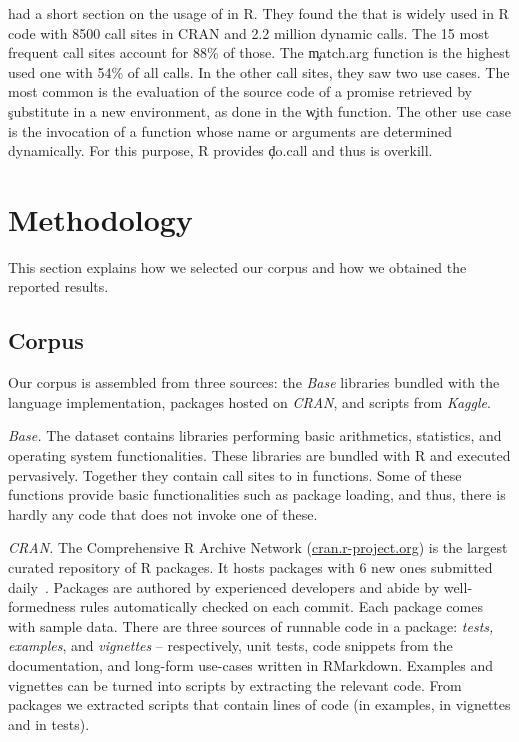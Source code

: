\documentclass[review,screen,acmsmall,anonymous=true]{acmart}
\newcommand{\mypara}[1]{\medskip\noindent\emph{#1}\xspace}
\begin{document}
\citet{ecoop12} had a short section on the usage of \eval in R. They found the
that \eval  is widely used in R code with 8500 call sites in CRAN and 2.2 million dynamic calls. The 15 most frequent call sites account for 88\% of those. The
\c{match.arg} function is the highest used one with 54\% of all calls. In the
other call sites, they saw two use cases. The most common is the evaluation of
the source code of a promise retrieved by \c{substitute} in a new environment,
\eg as done in the \c{with} function. The other use case is the invocation of a
function whose name or arguments are determined dynamically. For this purpose, R provides \c{do.call} and thus \eval is overkill.


\section{Methodology}

This section explains how we selected our corpus and how we obtained the
reported results.

\subsection{Corpus}

Our corpus is assembled from three sources: the \emph{Base} libraries bundled
with the language implementation, packages hosted on \emph{CRAN}, and scripts
from \emph{Kaggle}.

\mypara{Base.} The dataset contains \BasePackages libraries performing basic
arithmetics, statistics, and operating system functionalities. These libraries
are bundled with R and executed pervasively. Together they contain
\BaseEvalCallSites call sites to \eval in \BaseFunsWithEvals functions. Some of these
functions provide basic functionalities such as package loading, and thus, there
is hardly any code that does not invoke one of these.

\mypara{CRAN.} The Comprehensive R Archive Network
({\small \url{cran.r-project.org}}) is the largest curated repository of R
packages. It hosts \CranAvailablePackagesRnd packages with 6 new ones submitted
daily~\cite{Ligges2017}. Packages are authored by experienced developers and
abide by well-formedness rules automatically checked on each commit.
Each package comes with sample data. There are three sources of
runnable code in a package: \emph{tests, examples}, and \emph{vignettes} --
respectively, unit tests, code snippets from the documentation, and long-form
use-cases written in RMarkdown. Examples and vignettes can be turned into
scripts by extracting the relevant code. From \CranPackages packages we
extracted \CranRunnableScripts scripts that contain \CranRunnableCode lines of
code (\CranRunnableCodeExamplesRnd in examples, \CranRunnableCodeVignettesRnd in
vignettes and \CranRunnableCodeTestsRnd in tests).
\end{document}
